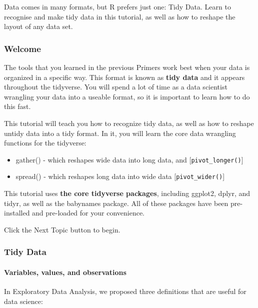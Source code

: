 \documentclass[
]{article}
\providecommand{\tightlist}{%
  \setlength{\itemsep}{0pt}\setlength{\parskip}{0pt}}
\begin{document}
Data comes in many formats, but R prefers just one: Tidy Data. Learn to
recognise and make tidy data in this tutorial, as well as how to reshape
the layout of any data set.

\hypertarget{welcome-13}{%
\subsubsection{Welcome}\label{welcome-13}}

The tools that you learned in the previous Primers work best when your
data is organized in a specific way. This format is known as
\textbf{tidy data} and it appears throughout the tidyverse. You will
spend a lot of time as a data scientist wrangling your data into a
useable format, so it is important to learn how to do this fast.

This tutorial will teach you how to recognize tidy data, as well as how
to reshape untidy data into a tidy format. In it, you will learn the
core data wrangling functions for the tidyverse:

\begin{itemize}
\tightlist
\item
  gather() - which reshapes wide data into long data, and
  {[}\texttt{pivot\_longer()}{]}
\item
  spread() - which reshapes long data into wide data
  {[}\texttt{pivot\_wider()}{]}
\end{itemize}

This tutorial uses \textbf{the core tidyverse packages}, including
ggplot2, dplyr, and tidyr, as well as the babynames package. All of
these packages have been pre-installed and pre-loaded for your
convenience.

Click the Next Topic button to begin.

\hypertarget{tidy-data}{%
\subsubsection{Tidy Data}\label{tidy-data}}

\hypertarget{variables-values-and-observations-1}{%
\paragraph{Variables, values, and
observations}\label{variables-values-and-observations-1}}

In Exploratory Data Analysis, we proposed three definitions that are
useful for data science:
\end{document}

